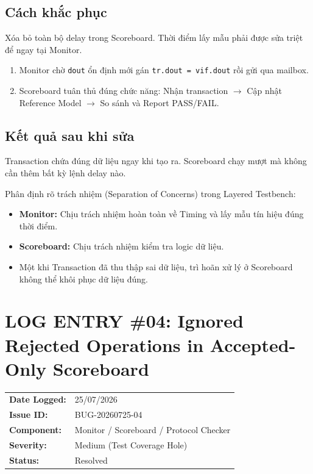 \documentclass[12pt, a4paper]{article}
\begin{document}
\subsection*{Cách khắc phục}
Xóa bỏ toàn bộ delay trong Scoreboard. Thời điểm lấy mẫu phải được sửa triệt để ngay tại Monitor.
\begin{enumerate}
    \item Monitor chờ \texttt{dout} ổn định mới gán \texttt{tr.dout = vif.dout} rồi gửi qua mailbox.
    \item Scoreboard tuân thủ đúng chức năng: Nhận transaction $\rightarrow$ Cập nhật Reference Model $\rightarrow$ So sánh và Report PASS/FAIL.
\end{enumerate}

\subsection*{Kết quả sau khi sửa}
Transaction chứa đúng dữ liệu ngay khi tạo ra. Scoreboard chạy mượt mà không cần thêm bất kỳ lệnh delay nào.

\begin{tcolorbox}[colback=noteBlue!5!white, colframe=noteBlue, title=\textbf{Bài học rút ra}]
Phân định rõ trách nhiệm (Separation of Concerns) trong Layered Testbench:
\begin{itemize}
    \item \textbf{Monitor:} Chịu trách nhiệm hoàn toàn về Timing và lấy mẫu tín hiệu đúng thời điểm.
    \item \textbf{Scoreboard:} Chịu trách nhiệm kiểm tra logic dữ liệu.
    \item Một khi Transaction đã thu thập sai dữ liệu, trì hoãn xử lý ở Scoreboard không thể khôi phục dữ liệu đúng.
\end{itemize}
\end{tcolorbox}


\newpage

\section*{LOG ENTRY \#04: Ignored Rejected Operations in Accepted-Only Scoreboard}

\begin{tcolorbox}[
    colback=bugHeaderBg,
    colframe=mainTitle,
    arc=2pt,
    boxrule=1pt,
    title=\textbf{ISSUE METADATA \& TRACKING INFO}
]
\begin{tabular}{ll}
    \textbf{Date Logged:}   & 25/07/2026 \\
    \textbf{Issue ID:}      & BUG-20260725-04 \\
    \textbf{Component:}     & Monitor / Scoreboard / Protocol Checker \\
    \textbf{Severity:}      & Medium (Test Coverage Hole) \\
    \textbf{Status:}        & Resolved \\
\end{tabular}
\end{tcolorbox}
\end{document}
